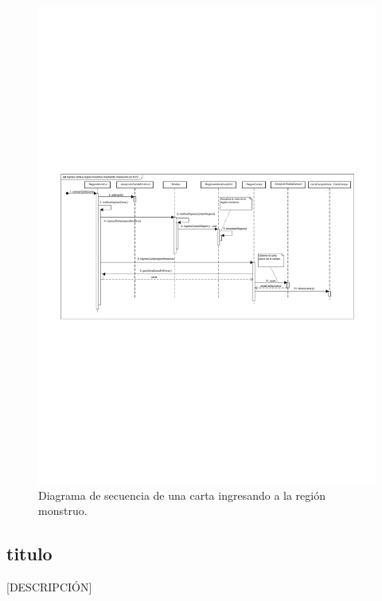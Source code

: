 \begin{figure}[H]
	\centering
	\includegraphics[scale=0.8]{includes/seq_Ingresa_carta_a_region_monstruo_mostrando_interaccion_en_MVC}
	\caption{Diagrama de secuencia de una carta ingresando a la región monstruo.}
	\label{seq_Ingresa_carta_a_region_monstruo_mostrando_interaccion_en_MVC}
\end{figure}

\subsection{titulo}

[DESCRIPCIÓN]

